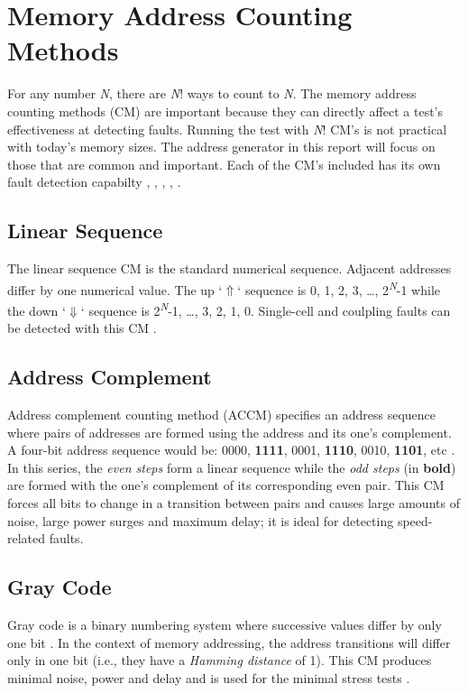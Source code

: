 \section{Memory Address Counting Methods}
\label{sect:bg-counting}
For any number \textit{N}, there are \textit{N}! ways to count to \textit{N}.  The memory address counting methods (CM) are important because they can directly affect a test's effectiveness at detecting faults.  Running the test with \textit{N}! CM's is not practical with today's memory sizes.  The address generator in this report will focus on those that are common and important.  Each of the CM's included has its own fault detection capabilty \cite{1347645}, \cite{990255}, \cite{1584048}, \cite{5359299}, \cite{1576336}.

\subsection{Linear Sequence}
The linear sequence CM is the standard numerical sequence.  Adjacent addresses differ by one numerical value.  The up `$\Uparrow$` sequence is 0, 1, 2, 3, \ldots, 2\textsuperscript{\textit{N}}-1 while the down `$\Downarrow$` sequence is 2\textsuperscript{\textit{N}}-1, \ldots, 3, 2, 1, 0.  Single-cell and coulpling faults can be detected with this CM \cite{5941430}.

\subsection{Address Complement}
Address complement counting method (ACCM) specifies an address sequence where pairs of addresses are formed using the address and its one's complement.  A four-bit address sequence would be: 0000, \textbf{1111}, 0001, \textbf{1110}, 0010, \textbf{1101}, etc \cite{VanDeGoor1991}.  In this series, the \textit{even steps} form a linear sequence while the \textit{odd steps} (in \textbf{bold}) are formed with the one's complement of its corresponding even pair.  This CM forces all bits to change in a transition between pairs and causes large amounts of noise, large power surges and maximum delay; it is ideal for detecting speed-related faults.

\subsection{Gray Code}
Gray code is a binary numbering system where successive values differ by only one bit \cite{VanDeGoor1991}.  In the context of memory addressing, the address transitions will differ only in one bit (i.e., they have a \textit{Hamming distance} of 1).  This CM produces minimal noise, power and delay and is used for the minimal stress tests \cite{5941430}.

